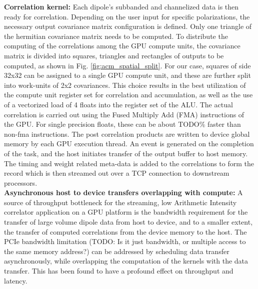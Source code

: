 \documentclass{ws-jai}
\begin{document}
\noindent \textbf {Correlation kernel:}  Each dipole's subbanded and channelized
data is  then ready for correlation.   Depending on the user  input for specific
polarizations,  the   necessary  output   covariance  matrix   configuration  is
defined.  Only one  triangle  of the  hermitian covariance  matrix  needs to  be
computed. To distribute the computing of  the correlations among the GPU compute
units, the covariance  matrix is divided into squares,  triangles and rectangles
of outputs  to be computed,  as shown in Fig.   \ref{fig:acm_spatial_split}. For
our case, squares  of side 32x32 can  be assigned to a single  GPU compute unit,
and these  are further  split into  work-units of  2x2 covariances.  This choice
results in the best utilization of the compute unit register set for correlation
and accumulation, as well  as the use of a vectorized load of  4 floats into the
register set of the ALU.  The actual  correlation is carried out using the Fused
Multiply Add (FMA) instructions of the  GPU.  For single precision floats, these
can  be about  TODO\% faster  than non-fma  instructions.  The  post correlation
products are written  to device global memory by each  GPU execution thread.  An
event  is generated  on  the completion  of  the task,  and  the host  initiates
transfer of  the output  buffer to  host memory. The  timing and  weight related
meta-data is added to the correlations to form the record which is then streamed
out over a TCP connection to downstream processors.\\

\noindent  \textbf  {Asynchronous  host  to device  transfers  overlapping  with
  compute:} A source of throughput  bottleneck for the streaming, low Arithmetic
Intensity  correlator  application   on  a  GPU  platform   is  the  bandwidth
requirement for  the transfer of large  volume dipole data from  host to device,
and to a  smaller extent, the transfer of computed  correlations from the device
memory to the  host. The PCIe bandwidth limitation (TODO:  Is it just bandwidth,
or multiple access  to the same memory address?) can  be addressed by scheduling
data transfer asynchronously,  while overlapping the computation  of the kernels
with  the data  transfer.  This  has been  found to  have a  profound effect  on
throughput and latency.\\
\end{document}
